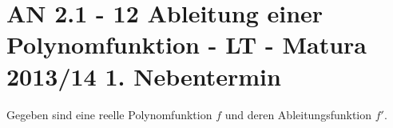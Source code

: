 \section{AN 2.1 - 12 Ableitung einer Polynomfunktion - LT - Matura 2013/14 1. Nebentermin}

\begin{beispiel}[AN 2.1]{1} %
				Gegeben sind eine reelle Polynomfunktion $f$ und deren Ableitungsfunktion $f'$.
				
\end{beispiel}
